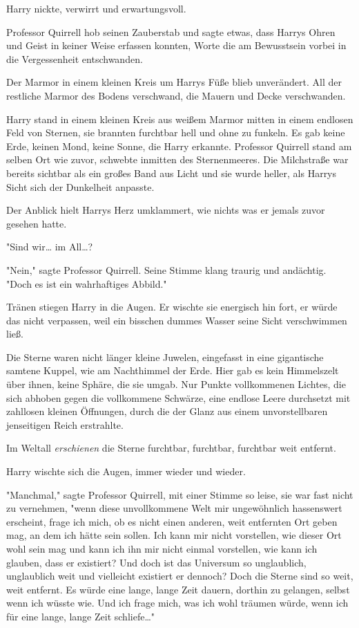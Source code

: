 {Harry nickte, verwirrt und erwartungsvoll.

Professor Quirrell hob seinen Zauberstab und sagte etwas, dass Harrys Ohren und Geist in keiner Weise erfassen konnten, Worte die am Bewusstsein vorbei in die Vergessenheit entschwanden.

Der Marmor in einem kleinen Kreis um Harrys Füße blieb unverändert. All der restliche Marmor des Bodens verschwand, die Mauern und Decke verschwanden.

Harry stand in einem kleinen Kreis aus weißem Marmor mitten in einem endlosen Feld von Sternen, sie brannten furchtbar hell und ohne zu funkeln. Es gab keine Erde, keinen Mond, keine Sonne, die Harry erkannte. Professor Quirrell stand am selben Ort wie zuvor, schwebte inmitten des Sternenmeeres. Die Milchstraße war bereits sichtbar als ein großes Band aus Licht und sie wurde heller, als Harrys Sicht sich der Dunkelheit anpasste.

Der Anblick hielt Harrys Herz umklammert, wie nichts was er jemals zuvor gesehen hatte.

"Sind wir… im All…?

"Nein," sagte Professor Quirrell. Seine Stimme klang traurig und andächtig. "Doch es ist ein wahrhaftiges Abbild."

Tränen stiegen Harry in die Augen. Er wischte sie energisch hin fort, er würde das nicht verpassen, weil ein bisschen dummes Wasser seine Sicht verschwimmen ließ.

Die Sterne waren nicht länger kleine Juwelen, eingefasst in eine gigantische samtene Kuppel, wie am Nachthimmel der Erde. Hier gab es kein Himmelszelt über ihnen, keine Sphäre, die sie umgab. Nur Punkte vollkommenen Lichtes, die sich abhoben gegen die vollkommene Schwärze, eine endlose Leere durchsetzt mit zahllosen kleinen Öffnungen, durch die der Glanz aus einem unvorstellbaren jenseitigen Reich erstrahlte.

Im Weltall \emph{erschienen} die Sterne furchtbar, furchtbar, furchtbar weit entfernt.

Harry wischte sich die Augen, immer wieder und wieder.

"Manchmal," sagte Professor Quirrell, mit einer Stimme so leise, sie war fast nicht zu vernehmen, "wenn diese unvollkommene Welt mir ungewöhnlich hassenswert erscheint, frage ich mich, ob es nicht einen anderen, weit entfernten Ort geben mag, an dem ich hätte sein sollen. Ich kann mir nicht vorstellen, wie dieser Ort wohl sein mag und kann ich ihn mir nicht einmal vorstellen, wie kann ich glauben, dass er existiert? Und doch ist das Universum so unglaublich, unglaublich weit und vielleicht existiert er dennoch? Doch die Sterne sind so weit, weit entfernt. Es würde eine lange, lange Zeit dauern, dorthin zu gelangen, selbst wenn ich wüsste wie. Und ich frage mich, was ich wohl träumen würde, wenn ich für eine lange, lange Zeit schliefe…"

}
